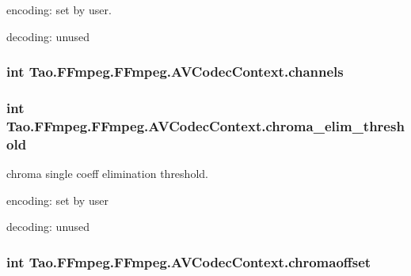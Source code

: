 \begin{DoxyItemize}
\item encoding: set by user.
\item decoding: unused 
\end{DoxyItemize}\hypertarget{struct_tao_1_1_f_fmpeg_1_1_f_fmpeg_1_1_a_v_codec_context_aaa6de950ebe89fe0b464b0f0def51900}{
\subsubsection[{channels}]{\setlength{\rightskip}{0pt plus 5cm}int {\bf Tao.FFmpeg.FFmpeg.AVCodecContext.channels}}}
\label{struct_tao_1_1_f_fmpeg_1_1_f_fmpeg_1_1_a_v_codec_context_aaa6de950ebe89fe0b464b0f0def51900}
\hypertarget{struct_tao_1_1_f_fmpeg_1_1_f_fmpeg_1_1_a_v_codec_context_aaf715b9ae82a279e59391f9198f94b0a}{
\subsubsection[{chroma\_\-elim\_\-threshold}]{\setlength{\rightskip}{0pt plus 5cm}int {\bf Tao.FFmpeg.FFmpeg.AVCodecContext.chroma\_\-elim\_\-threshold}}}
\label{struct_tao_1_1_f_fmpeg_1_1_f_fmpeg_1_1_a_v_codec_context_aaf715b9ae82a279e59391f9198f94b0a}
chroma single coeff elimination threshold.
\begin{DoxyItemize}
\item encoding: set by user
\item decoding: unused 
\end{DoxyItemize}\hypertarget{struct_tao_1_1_f_fmpeg_1_1_f_fmpeg_1_1_a_v_codec_context_aa3c4c208f721b42569672e5bc3a3e35e}{
\subsubsection[{chromaoffset}]{\setlength{\rightskip}{0pt plus 5cm}int {\bf Tao.FFmpeg.FFmpeg.AVCodecContext.chromaoffset}}}

